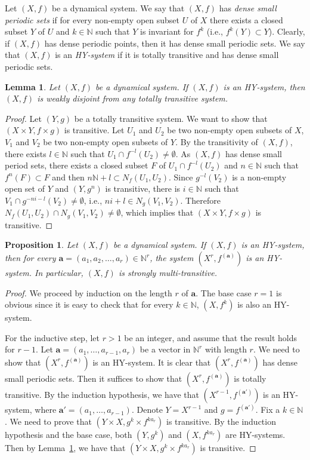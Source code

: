 \documentclass[12pt,a4paper]{amsart}
\newtheorem{lem}[thm]{Lemma}
\newtheorem{prop}[thm]{Proposition}
\theoremstyle{definition}
\numberwithin{equation}{section}
\begin{document}
Let $(X, f)$ be a dynamical system. We say that $(X, f)$ has
\emph{dense small periodic sets} if for every non-empty open subset $U$ of $X$
there exists a closed subset $Y$ of $U$ and $k \in\mathbb{N}$
such that $Y$ is invariant for $f^ k$ (i.e., $f^k(Y)\subset Y$).
Clearly, if $(X,f)$ has dense periodic points,
then it  has dense small periodic sets.
We say that $(X,f)$ is an \emph{HY-system}
if it is totally transitive and has dense small periodic sets.

\begin{lem}\label{lem:HY-sys-weak-disjoint}
Let $(X, f)$ be a dynamical system.
If $(X,f)$ is an HY-system, then $(X,f)$ is weakly disjoint from any totally transitive system.
\end{lem}
\begin{proof}
Let $(Y,g)$ be a totally transitive system. We want to show that $(X\times Y,f\times g)$ is transitive.
Let $U_1$ and $U_2$ be two non-empty open subsets of $X$,
$V_1$ and $V_2$ be two non-empty open subsets of $Y$.
By the transitivity of $(X,f)$, there exists $l\in\mathbb{N}$ such that $U_1\cap f^{-l}(U_2)\neq\emptyset$.
As $(X,f)$ has dense small period sets,
there exists a closed subset $F$ of $U_1\cap f^{-l}(U_2)$ and $n\in\mathbb{N}$
such that $f^n(F)\subset F$ and then $n\mathbb{N}+l\subset N_{f}(U_1,U_2)$.
Since $g^{-l}(V_2)$ is a non-empty open set of $Y$ and $(Y,g^n)$ is transitive,
there is  $i\in\mathbb{N}$ such that $V_1\cap g^{-ni-l}(V_2)\neq\emptyset$,
i.e., $ni+l\in N_{g}(V_1, V_2)$.
Therefore $N_{f}(U_1,U_2)\cap N_{g}(V_1, V_2)\neq\emptyset$,
which implies that $(X\times Y,f\times g)$ is transitive.
\end{proof}

\begin{prop}\label{prop:HY-SMT}
Let $(X, f)$ be a dynamical system.
If $(X,f)$ is an HY-system, then for every $\mathbf{a}=(a_1,a_2,\dotsc,a_r)\in\mathbb{N}^r$,
the system $(X^r,f^{(\mathbf{a})})$ is an HY-system.
In particular, $(X,f)$ is strongly multi-transitive.
\end{prop}

\begin{proof}
We proceed by induction on the length $r$ of $\mathbf{a}$.
The base case  $r=1$ is obvious since it is easy to check that for every $k\in\mathbb{N}$,
$(X,f^k)$ is also an HY-system.

For the inductive step, let $r > 1$ be an integer, and assume that the result holds for $r-1$.
Let $\mathbf{a}=(a_1,\dotsc,a_{r-1},a_r)$ be a vector in $\mathbb{N}^r$ with length $r$.
We need to show that $(X^r,f^{(\mathbf{a})})$ is an HY-system.
It is clear that $(X^r, f^{(\mathbf{a})})$ has dense small periodic sets.
Then it suffices to show that $(X^r, f^{(\mathbf{a})})$ is totally transitive.
By the induction hypothesis, we have that $(X^{r-1},f^{(\mathbf{a}')})$ is an HY-system,
where $\mathbf{a'}=(a_1,\dotsc,a_{r-1})$. Denote $Y=X^{r-1}$ and $g=f^{(\mathbf{a}')}$.
Fix a $k\in\mathbb{N}$. We need to prove that $(Y\times X, g^k\times f^{ka_{r}})$ is transitive.
By the induction hypothesis and the base case,
both $(Y,g^k)$ and $(X,f^{ka_{r}})$ are HY-systems.
Then by Lemma~\ref{lem:HY-sys-weak-disjoint}, we have that $(Y\times X, g^k\times f^{ka_{r}})$ is transitive.
\end{proof}
\end{document}
